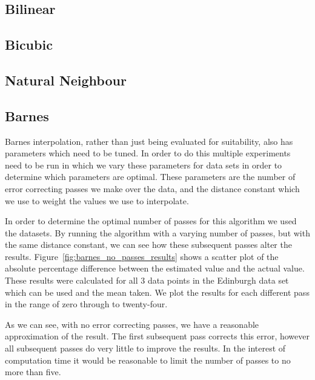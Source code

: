         \subsection{Bilinear}\label{prediction_evaluation_results_bilinear}

        \subsection{Bicubic}\label{prediction_evaluation_results_bicubic}

        \subsection{Natural Neighbour}\label{prediction_evaluation_results_natural_neighbour}

        \subsection{Barnes}\label{prediction_evaluation_results_barnes}

        	Barnes interpolation, rather than just being evaluated for suitability, also has parameters which need to be tuned. In order to do this multiple experiments need to be run in which we vary these parameters for data sets in order to determine which parameters are optimal. These parameters are the number of error correcting passes we make over the data, and the distance constant which we use to weight the values we use to interpolate. 

        	In order to determine the optimal number of passes for this algorithm we used the datasets. By running the algorithm with a varying number of passes, but with the same distance constant, we can see how these subsequent passes alter the results. Figure~\ref{fig:barnes_no_passes_results} shows a scatter plot of the absolute percentage difference between the estimated value and the actual value. These results were calculated for all 3 data points in the Edinburgh data set which can be used and the mean taken. We plot the results for each different pass in the range of zero through to twenty-four. 


        	As we can see, with no error correcting passes, we have a reasonable approximation of the result. The first subsequent pass corrects this error, however all subsequent passes do very little to improve the results. In the interest of computation time it would be reasonable to limit the number of passes to no more than five. 

